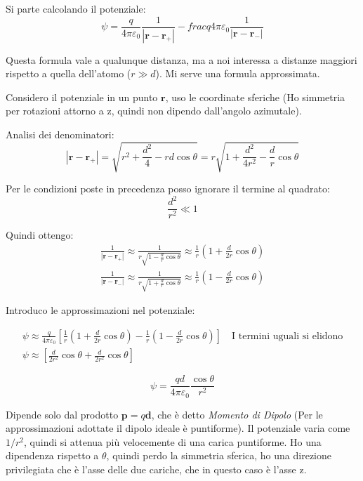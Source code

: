 \documentclass[a4paper]{scrarticle}
\begin{document}
Si parte calcolando il potenziale:
\begin{equation*}
    \psi = \frac{q}{4\pi\varepsilon_0} \frac{1}{\left|\bm r - \bm r_+\right|} - frac{q}{4\pi\varepsilon_0} \frac{1}{\left|\bm r - \bm r_-\right|}
\end{equation*}

Questa formula vale a qualunque distanza, ma a noi interessa a distanze maggiori rispetto a quella dell'atomo ($r \gg d$). Mi serve una formula approssimata.

Considero il potenziale in un punto $\bm r$, uso le coordinate sferiche (Ho simmetria per rotazioni attorno a z, quindi non dipendo dall'angolo azimutale).

Analisi dei denominatori:
\begin{equation*}
    \left|\bm r - \bm r_+\right|= \sqrt{r^2 + \frac{d^2}{4} - rd \cos \theta} = r \sqrt{1 + \frac{d^2}{4r^2} - \frac{d}{r}\cos \theta}
\end{equation*}

Per le condizioni poste in precedenza posso ignorare il termine al quadrato:
\begin{equation*}
    \frac{d^2}{r^2} \ll 1
\end{equation*}

Quindi ottengo:
\begin{gather}
    \frac{1}{\left|\bm r - \bm r_+\right|} \approx \frac{1}{r \sqrt{1 - \frac{d}{r}\cos \theta}} \approx \frac{1}{r}(1 + \frac{d}{2r}\cos \theta)\\
    \frac{1}{\left|\bm r - \bm r_-\right|} \approx \frac{1}{r \sqrt{1 + \frac{d}{r}\cos \theta}} \approx \frac{1}{r}(1 - \frac{d}{2r}\cos \theta)
\end{gather}

Introduco le approssimazioni nel potenziale:

\begin{gather*}
    \psi \approx \frac{q}{4\pi\varepsilon_0}\left[\frac{1}{r}(1 + \frac{d}{2r}\cos \theta) - \frac{1}{r}(1 - \frac{d}{2r}\cos \theta)\right] \quad \text{I termini uguali si elidono}\\
    \psi \approx \left[\frac{d}{2r^2}\cos \theta + \frac{d}{2r^2}\cos \theta\right]
\end{gather*}

\begin{equation}
    \psi = \frac{qd}{4\pi\varepsilon_0}\frac{\cos\theta}{r^2}
\end{equation}

Dipende solo dal prodotto $\bm p = q \bm d$, che è detto \emph{Momento di Dipolo} (Per le approssimazioni adottate il dipolo ideale è puntiforme).
Il potenziale varia come $1/r^2$, quindi si attenua più velocemente di una carica puntiforme.
Ho una dipendenza rispetto a $\theta$, quindi perdo la simmetria sferica, ho una direzione privilegiata che è l'asse delle due cariche, che in questo caso è l'asse z.
\end{document}
